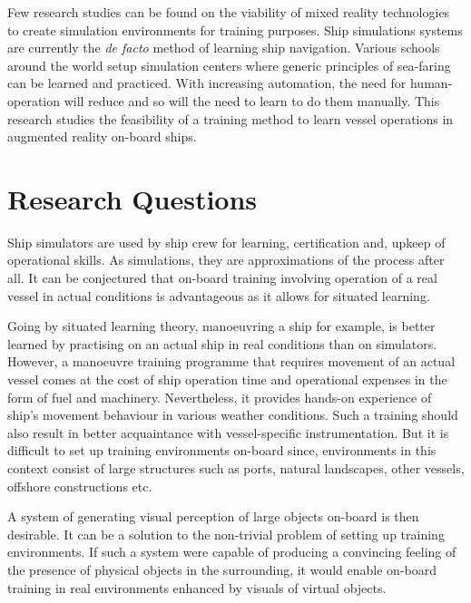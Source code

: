 

%

Few research studies can be found on the viability of mixed reality technologies to create simulation environments for training purposes. Ship simulations systems are currently the \textit{de facto} method of learning ship navigation. Various schools around the world setup simulation centers where generic principles of sea-faring can be learned and practiced. With increasing automation, the need for human-operation will reduce and so will the need to learn to do them manually. This research studies the feasibility of a training method to learn vessel operations in augmented reality on-board ships. 

\section{Research Questions}
Ship simulators are used by ship crew for learning, certification and, upkeep of operational skills. As simulations, they are approximations of the process after all. It can be conjectured that on-board training involving operation of a real vessel in actual conditions is advantageous as it allows for situated learning. 

Going by situated learning theory, manoeuvring a ship for example, is better learned by practising on an actual ship in real conditions than on simulators. However, a manoeuvre training programme that requires movement of an actual vessel comes at the cost of ship operation time and operational expenses in the form of fuel and machinery. Nevertheless, it provides hands-on experience of ship's movement behaviour in various weather conditions. Such a training should also result in better acquaintance with vessel-specific instrumentation. But it is difficult to set up training environments on-board since, environments in this context consist of large structures such as ports, natural landscapes, other vessels, offshore constructions etc.

A system of generating visual perception of large objects on-board is then desirable. It can be a solution to the non-trivial problem of setting up training environments. If such a system were capable of producing a convincing feeling of the presence of physical objects in the surrounding, it would enable on-board training in real environments enhanced by visuals of virtual objects.

